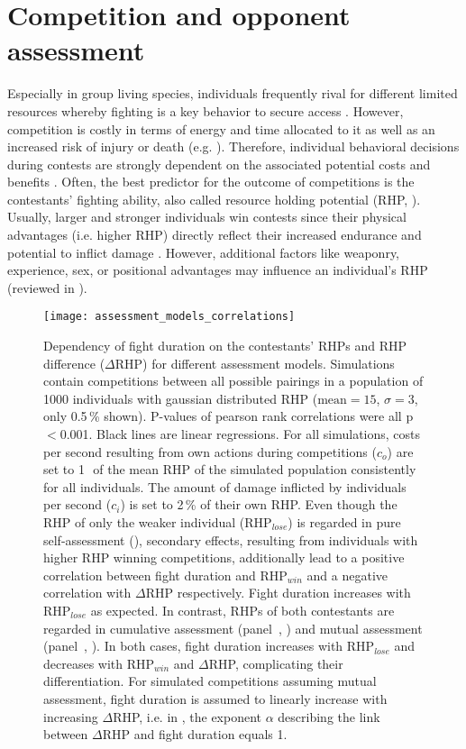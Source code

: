 \section{Competition and opponent assessment}

Especially in group living species, individuals frequently rival for different limited resources whereby fighting is a key behavior to secure access \citep{Cluttonbrock1979, Chapman1995, Markham2015}. However, competition is costly in terms of energy and time allocated to it as well as an increased risk of injury or death (e.g. \citealp{Briffa2004}). Therefore, individual behavioral decisions during contests are strongly dependent on the associated potential costs and benefits \citep{ArnottElwood2008, ArnottElwood2009}. Often, the best predictor for the outcome of competitions is the contestants' fighting ability, also called resource holding potential (RHP, \citealp{Parker1974}). Usually, larger and stronger individuals win contests since their physical advantages (i.e. higher RHP) directly reflect their increased endurance and potential to inflict damage \citep{Archer1988}. However, additional factors like weaponry, experience, sex, or positional advantages may influence an individual's RHP (reviewed in \citealp{ArnottElwood2008}). 

\begin{figure}[h!]
  \centerline{\texttt{[image: assessment\_models\_correlations]}}
  \caption{\label{assessment_correlations} Dependency of fight duration on the contestants' RHPs and RHP difference ($\Delta$RHP) for different assessment models. Simulations contain competitions between all possible pairings in a population of 1000 individuals with gaussian distributed RHP ($\text{mean}=15$, $\sigma = 3$, only 0.5\,\% shown). P-values of pearson rank correlations were all p$<$0.001. Black lines are linear regressions. For all simulations, costs per second resulting from own actions during competitions ($c_o$) are set to 1\,\textperthousand\, of the mean RHP of the simulated population consistently for all individuals. The amount of damage inflicted by individuals per second ($c_i$) is set to 2\,\% of their own RHP.  Even though the RHP of only the weaker individual (RHP$_{lose}$) is regarded in pure self-assessment (), secondary effects, resulting from individuals with higher RHP winning competitions, additionally lead to a positive correlation between fight duration and RHP$_{win}$ and a negative correlation with $\Delta$RHP respectively. Fight duration increases with RHP$_{lose}$ as expected.  In contrast, RHPs of both contestants are regarded in cumulative assessment (panel~, ) and mutual assessment (panel~, ). In both cases, fight duration increases with RHP$_{lose}$ and decreases with RHP$_{win}$ and $\Delta$RHP, complicating their differentiation. For simulated competitions assuming mutual assessment, fight duration is assumed to linearly increase with increasing $\Delta$RHP, i.e. in , the exponent $\alpha$ describing the link between $\Delta$RHP and fight duration equals 1.}
\end{figure}

